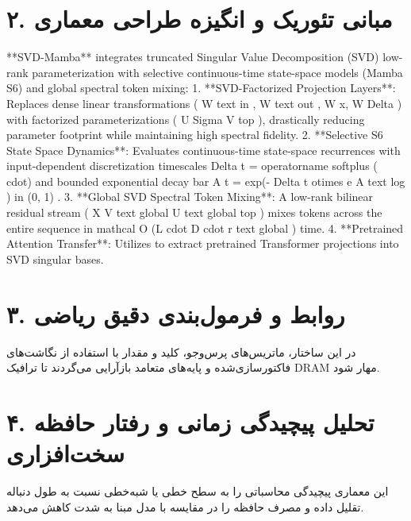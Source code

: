 \documentclass[12pt,a4paper]{article}
\begin{document}
\section*{۲. مبانی تئوریک و انگیزه طراحی معماری}
**SVD-Mamba** integrates truncated Singular Value Decomposition (SVD) low-rank parameterization with selective continuous-time state-space models (Mamba S6) and global spectral token mixing: 1. **SVD-Factorized Projection Layers**: Replaces dense linear transformations ( W text in , W text out , W x, W Delta ) with factorized parameterizations ( U Sigma V top ), drastically reducing parameter footprint while maintaining high spectral fidelity. 2. **Selective S6 State Space Dynamics**: Evaluates continuous-time state-space recurrences with input-dependent discretization timescales Delta t = operatorname softplus ( cdot) and bounded exponential decay bar A t = exp(- Delta t otimes e A text log ) in (0, 1) . 3. **Global SVD Spectral Token Mixing**: A low-rank bilinear residual stream ( X V text global U text global top ) mixes tokens across the entire sequence in mathcal O (L cdot D cdot r text global ) time. 4. **Pretrained Attention Transfer**: Utilizes to extract pretrained Transformer projections into SVD singular bases.

\section*{۳. روابط و فرمول‌بندی دقیق ریاضی}
در این ساختار، ماتریس‌های پرس‌وجو، کلید و مقدار با استفاده از نگاشت‌های فاکتورسازی‌شده و پایه‌های متعامد بازآرایی می‌گردند تا ترافیک DRAM مهار شود.

\section*{۴. تحلیل پیچیدگی زمانی و رفتار حافظه سخت‌افزاری}
این معماری پیچیدگی محاسباتی را به سطح خطی یا شبه‌خطی نسبت به طول دنباله تقلیل داده و مصرف حافظه را در مقایسه با مدل مبنا به شدت کاهش می‌دهد.
\end{document}
